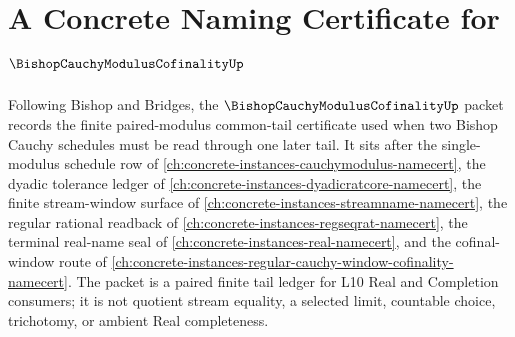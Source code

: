 \chapter{A Concrete Naming Certificate for $\BishopCauchyModulusCofinalityUp$}
\label{ch:concrete-instances-bishop-cauchy-modulus-cofinality-namecert}

Following Bishop and Bridges, the $\BishopCauchyModulusCofinalityUp$ packet records the finite paired-modulus common-tail certificate used when two Bishop Cauchy schedules must be read through one later tail. It sits after the single-modulus schedule row of \autoref{ch:concrete-instances-cauchymodulus-namecert}, the dyadic tolerance ledger of \autoref{ch:concrete-instances-dyadicratcore-namecert}, the finite stream-window surface of \autoref{ch:concrete-instances-streamname-namecert}, the regular rational readback of \autoref{ch:concrete-instances-regseqrat-namecert}, the terminal real-name seal of \autoref{ch:concrete-instances-real-namecert}, and the cofinal-window route of \autoref{ch:concrete-instances-regular-cauchy-window-cofinality-namecert}. The packet is a paired finite tail ledger for L10 Real and Completion consumers; it is not quotient stream equality, a selected limit, countable choice, trichotomy, or ambient Real completeness.

